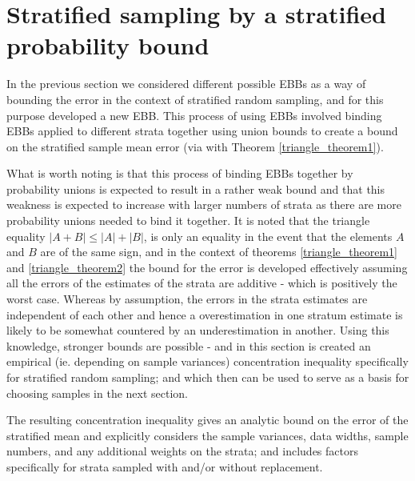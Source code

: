 

\section{Stratified sampling by a stratified probability bound}\label{section:SEBB}

In the previous section we considered different possible EBBs as a way of bounding the error in the context of stratified random sampling, and for this purpose developed a new EBB.
This process of using EBBs involved binding EBBs applied to different strata together using union bounds to create a bound on the stratified sample mean error (via with Theorem \ref{triangle_theorem1}).

What is worth noting is that this process of binding EBBs together by probability unions is expected to result in a rather weak bound and that this weakness is expected to increase with larger numbers of strata as there are more probability unions needed to bind it together.
It is noted that the triangle equality $|A+B|\le |A|+|B|$, is only an equality in the event that the elements $A$ and $B$ are of the same sign, and in the context of theorems \ref{triangle_theorem1} and \ref{triangle_theorem2} the bound for the error is developed effectively assuming all the errors of the estimates of the strata are additive - which is positively the worst case.
Whereas by assumption, the errors in the strata estimates are independent of each other and hence a overestimation in one stratum estimate is likely to be somewhat countered by an underestimation in another.
Using this knowledge, stronger bounds are possible - and in this section is created an empirical (ie. depending on sample variances) concentration inequality specifically for stratified random sampling; and which then can be used to serve as a basis for choosing samples in the next section.

The resulting concentration inequality gives an analytic bound on the error of the stratified mean and explicitly considers the sample variances, data widths, sample numbers, and any additional weights on the strata; and includes factors specifically for strata sampled with and/or without replacement.

